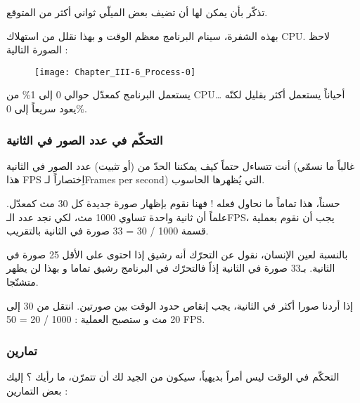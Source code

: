 \begin{information}
تذكّر بأن
يمكن لها أن تضيف بعض الميلّي ثواني أكثر من المتوقع.
\end{information}

بهذه الشفرة، سينام البرنامج معظم الوقت و بهذا نقلل من استهلاك
\textenglish{CPU}.
لاحظ الصورة التالية :

\begin{figure}[H]
	\centering
	\texttt{[image: Chapter\_III-6\_Process-0]}
\end{figure}

يستعمل البرنامج كمعدّل حوالي 0 إلى 1\% من 
\textenglish{CPU}\dots
أحياناً يستعمل أكثر بقليل لكنّه يعود سريعاً إلى 0\%.

\subsubsection{التحكّم في عدد الصور في الثانية}

أنت تتساءل حتماً كيف يمكننا الحدّ من (أو تثبيت) عدد الصور في الثانية (غالباً ما نسمّي هذا
\textenglish{FPS}
اِختصاراً لـ\textenglish{Frames per second})
التي يُظهرها الحاسوب.

حسناً، هذا تماماً ما نحاول فعله ! فهنا نقوم بإظهار صورة جديدة كل 30 مث كمعدّل. علماً أن ثانية واحدة تساوي 1000 مث، لكي نجد عدد الـ\textenglish{FPS}،
يجب أن نقوم بعملية قسمة
1000 / 30 = 33
 صورة في الثانية بالتقريب.
 
بالنسبة لعين الإنسان، نقول عن التحرّك أنه رشيق إذا احتوى على الأقل 25 صورة في الثانية. بـ33 صورة في الثانية إذاً فالتحرّك في البرنامج رشيق تماما و بهذا لن يظهر متشنّجا. 

إذا أردنا صورا أكثر في الثانية، يجب إنقاص حدود الوقت بين صورتين. انتقل من 30 إلى 20 مث و ستصبح العملية :
1000 / 20 = 50 \textenglish{FPS}.

\subsubsection{تمارين}
التحكّم في الوقت ليس أمراً بديهياً، سيكون من الجيد لك أن تتمرّن، ما رأيك ؟ إليك بعض التمارين :

